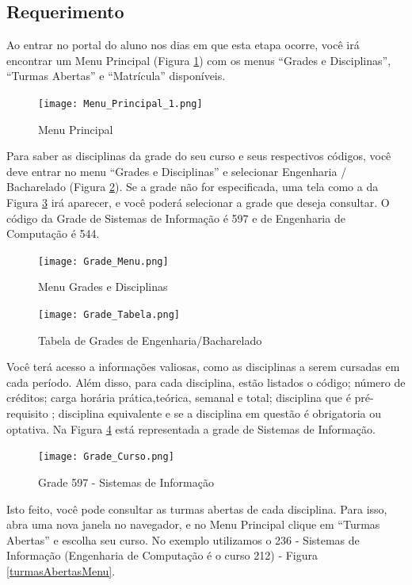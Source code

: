 \documentclass[a4paper,12pt,openany]{article}
\begin{document}
\subsection{Requerimento}

Ao entrar no portal do aluno nos dias em que esta etapa ocorre, você irá encontrar um Menu Principal (Figura \ref{menuPrincipal}) com os menus ``Grades e Disciplinas'', ``Turmas Abertas'' e ``Matrícula'' disponíveis.

	\begin{figure}[ht!]  \centering
		\texttt{[image: Menu\_Principal\_1.png]}
		\caption{Menu Principal}
		\label{menuPrincipal}
	\end{figure}

Para saber as disciplinas da grade do seu curso e seus respectivos códigos, você deve entrar no menu ``Grades e Disciplinas'' e selecionar Engenharia / Bacharelado  (Figura  \ref{gradeMenu}). Se a grade não for especificada, uma tela como a da Figura  \ref{gradeTabela} irá aparecer, e você poderá selecionar a grade que deseja consultar. O código da Grade de Sistemas de Informação é 597 e de Engenharia de Computação é 544.

	\begin{figure}[ht!]  \centering
		\texttt{[image: Grade\_Menu.png]}
		\caption{Menu Grades e Disciplinas}
		\label{gradeMenu}
	\end{figure}

	\begin{figure}[ht!]  \centering
		\texttt{[image: Grade\_Tabela.png]}
		\caption{Tabela de Grades de Engenharia/Bacharelado}
		\label{gradeTabela}
	\end{figure}

Você terá acesso a informações valiosas, como as disciplinas a serem cursadas em cada período. Além disso, para cada disciplina, estão listados o código; número de créditos; carga horária prática,teórica, semanal e total; disciplina que é pré-requisito ; disciplina equivalente e se a disciplina em questão é obrigatoria ou optativa. Na Figura \ref{gradeCurso} está representada a grade de Sistemas de Informação.

	\begin{figure}[ht!]  \centering
		\texttt{[image: Grade\_Curso.png]}
		\caption{Grade 597 - Sistemas de Informação}
		\label{gradeCurso}
	\end{figure}

Isto feito, você pode consultar as turmas abertas de cada disciplina. Para isso, abra uma nova janela no navegador, e no Menu Principal clique em ``Turmas Abertas'' e escolha seu curso. No exemplo utilizamos o 236 - Sistemas de Informação (Engenharia de Computação é o curso 212) - Figura \ref{turmasAbertasMenu}.
\end{document}
